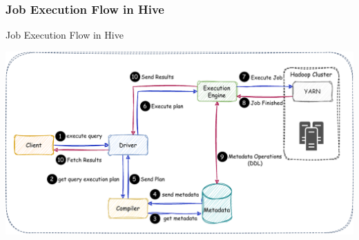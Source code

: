\subsubsection{Job Execution Flow in Hive}
\begin{frame}{Job Execution Flow in Hive}

\includegraphics[width=\textwidth,height=\textheight,keepaspectratio]{./Figures/chapter-03/Hive_Query_Flow.pdf}

	\end{frame}



